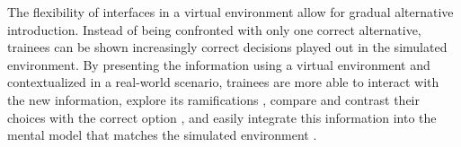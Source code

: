 The flexibility of interfaces in a virtual environment allow for gradual alternative introduction. Instead of being confronted with only one correct alternative, trainees can be shown increasingly correct decisions played out in the simulated environment. By presenting the information using a virtual environment and contextualized in a real-world scenario, trainees are more able to interact with the new information, explore its ramifications \citep{Ericsson1993, Patterson2010}, compare and contrast their choices with the correct option \citep{Fowlkes2009}, and easily integrate this information into the mental model that matches the simulated environment \citep{Salzman1999}.
